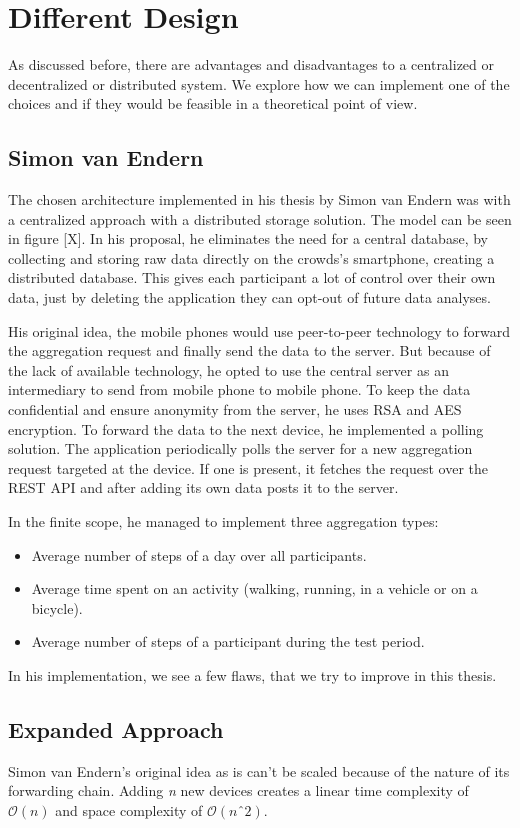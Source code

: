 \section{Different Design}
As discussed before, there are advantages and disadvantages to a centralized or decentralized or distributed system. We explore how we can implement one of the choices and if they would be feasible in a theoretical point of view.
\subsection{Simon van Endern}
The chosen architecture implemented in his thesis by Simon van Endern was with a centralized approach with a distributed storage solution. The model can be seen in figure [X].
In his proposal, he eliminates the need for a central database, by collecting and storing raw data directly on the crowds's smartphone, creating a distributed database. This gives each participant a lot of control over their own data, just by deleting the application they can opt-out of future data analyses.

His original idea, the mobile phones would use peer-to-peer technology to forward the aggregation request and finally send the data to the server. But because of the lack of available technology, he opted to use the central server as an intermediary to send from mobile phone to mobile phone. To keep the data confidential and ensure anonymity from the server, he uses RSA and AES encryption. To forward the data to the next device, he implemented a polling solution. The application periodically polls the server for a new aggregation request targeted at the device. If one is present, it fetches the request over the REST API and after adding its own data posts it to the server.

In the finite scope, he managed to implement three aggregation types:
\begin{itemize}
	\item Average number of steps of a day over all participants. 
	\item Average time spent on an activity (walking, running, in a vehicle or on a bicycle).
	\item Average number of steps of a participant during the test period. 
\end{itemize}

In his implementation, we see a few flaws, that we try to improve in this thesis. 

\subsection{Expanded Approach}
Simon van Endern's original idea as is can't be scaled because of the nature of its forwarding chain. Adding \textit{n} new devices creates a linear time complexity of \(\mathcal{O}(n)\) and space complexity of \(\mathcal{O}(nˆ2)\). 
